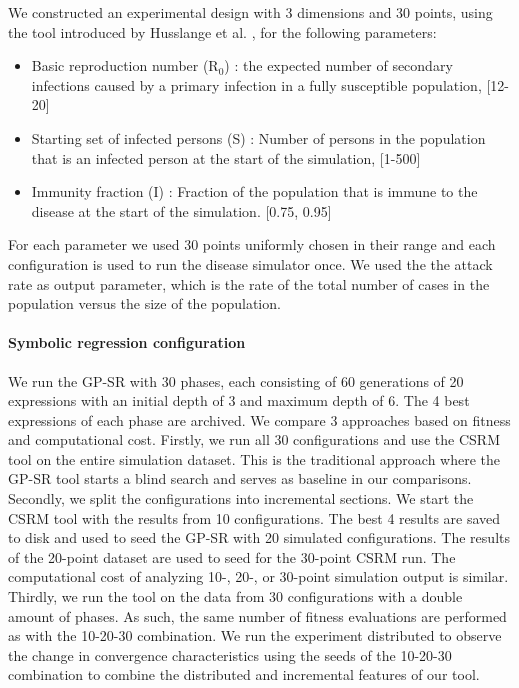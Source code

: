 We constructed an experimental design with 3 dimensions and 30 points, using the tool introduced by Husslange et al. \citep{DOE}, for the following parameters:
\begin{itemize}
\item Basic reproduction number (R$_0$) : the expected number of secondary infections caused by a primary infection in a fully susceptible population, [12-20]
\item Starting set of infected persons (S) : Number of persons in the population that is an infected person at the start of the simulation, [1-500]
\item Immunity fraction (I) : Fraction of the population that is immune to the disease at the start of the simulation. [0.75, 0.95]
\end{itemize}
For each parameter we used 30 points uniformly chosen in their range and each configuration is used to run the disease simulator once. 
We used the the attack rate as output parameter, which is the rate of the total number of cases in the population versus the size of the population. 



\paragraph{Symbolic regression configuration}
We run the GP-SR with 30 phases, each consisting of 60 generations of 20 expressions with an initial depth of 3 and maximum depth of 6. The 4 best expressions of each phase are archived. %
We compare 3 approaches based on fitness and computational cost. Firstly, we run all 30 configurations and use the CSRM tool on the entire simulation dataset. This is the traditional approach where the GP-SR tool starts a blind search and serves as baseline in our comparisons.
Secondly, we split the configurations into incremental sections. We start the CSRM tool with the results from 10 configurations. The best 4 results are saved to disk and used to seed the GP-SR with  20 simulated configurations. The results of the 20-point dataset are used to seed for the 30-point CSRM run. The computational cost of analyzing 10-, 20-, or 30-point simulation output is similar. 
Thirdly, we run the tool on the data from 30 configurations with a double amount of phases. As such, the same number of fitness evaluations are performed as with the 10-20-30 combination. 
We run the experiment distributed to observe the change in convergence characteristics using the seeds of the 10-20-30 combination to combine the distributed and incremental features of our tool. %

